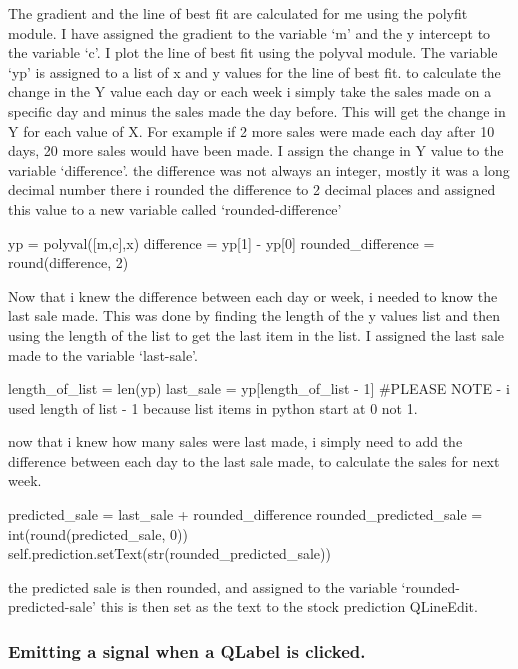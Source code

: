 The gradient and the line of best fit are calculated for me using the polyfit module. I have assigned the gradient to the variable `m' and the y intercept to the variable `c'. I plot the line of best fit using the polyval module. The variable `yp' is assigned to a list of x and y values for the line of best fit. to calculate the change in the Y value each day or each week i simply take the sales made on a specific day and minus the sales made the day before. This will get the change in Y for each value of X. For example if 2 more sales were made each day after 10 days, 20 more sales would have been made. I assign the change in Y value to the variable `difference'. the difference was not always an integer, mostly it was a long decimal number there i rounded the difference to 2 decimal places and assigned this value to a new variable called `rounded-difference'

\begin{python}
yp = polyval([m,c],x)
difference = yp[1] - yp[0]
rounded_difference = round(difference, 2)
\end{python}

Now that i knew the difference between each day or week, i needed to know the last sale made. This was done by finding the length of the y values list and then using the length of the list to get the last item in the list. I assigned the last sale made to the variable `last-sale'.

\begin{python}
length_of_list = len(yp)
last_sale = yp[length_of_list - 1]
#PLEASE NOTE - i used length of list - 1 because list items in python start at 0 not 1.
\end{python}

now that i knew how many sales were last made, i simply need to add the difference between each day to the last sale made, to calculate the sales for next week.

\begin{python}
predicted_sale = last_sale + rounded_difference
rounded_predicted_sale = int(round(predicted_sale, 0))
self.prediction.setText(str(rounded_predicted_sale))
\end{python}

the predicted sale is then rounded, and assigned to the variable `rounded-predicted-sale' this is then set as the text to the stock prediction QLineEdit.

\pagebreak

\subsubsection{Emitting a signal when a QLabel is clicked.}

